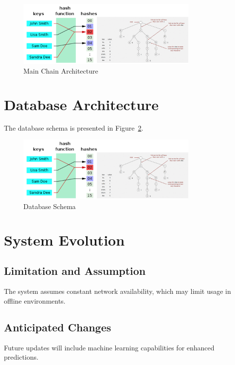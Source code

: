 \begin{figure}[h]
    \centering
    \includegraphics[width=0.8\textwidth]{images/hashing.png}
    \caption{Main Chain Architecture}
    \label{fig:main_chain}
\end{figure}

\section{Database Architecture}
The database schema is presented in Figure~\ref{fig:database_schema}.

\begin{figure}[h]
    \centering
    \includegraphics[width=0.8\textwidth]{images/hashing.png}
    \caption{Database Schema}
    \label{fig:database_schema}
\end{figure}

\section{System Evolution}
\subsection{Limitation and Assumption}
The system assumes constant network availability, which may limit usage in offline environments.

\subsection{Anticipated Changes}
Future updates will include machine learning capabilities for enhanced predictions.
